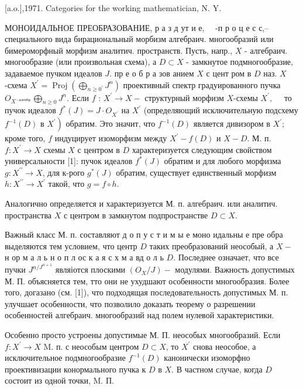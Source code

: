 \documentclass[10pt]{article}
\begin{document}
[a.o.],1971. Categories for the working mathematician, N. Y.



МОНОИДАЛЬНОЕ ПРЕОБРАЗОВАНИЕ, р а з д ут и е, $\quad$-п р о ц е с с,-- специального вида бирациональный морбизм алгебраич. многообразий или бимероморфный морфизм аналитич. пространств. Пусть, напр., $X$ - алгебраич. многообразие (или произвольная схема), а $D \subset X$ - замкнутое подмногообразие, задаваемое пучком идеалов $J$. пр е о б р а зов анием $X$ с цент ром в $D$ наз. $X$-схема $X^{\prime}=\operatorname{Proj}\left(\bigoplus_{n \geqslant 0^{\prime}} J^{n}\right)$ проективный спектр градуированного пучка $O_{X^{-а л г е б р ~}} \bigoplus_{n \geqslant 0} J^{n}$. Если $f$ : $X^{\prime} \rightarrow X-$ структурный морфизм $X$-схемы $X^{\prime}, \quad$ то пучок идеалов $f^{*}(J)=J \cdot O_{X^{\prime}}$ на $X^{\prime}$ (определяющий исключительную подсхему $f^{-1}(D)$ в $\left.X^{\prime}\right)$ обратим. Это значит, что $f^{-1}(D)$ является дивизором в $X^{\prime} ;$ кроме того, $f$ индуцирует изоморфизм между $X^{\prime}-f(D)$ и $X-D$. М. п. $f: X^{\prime} \rightarrow X$ схемы $X$ с центром в $D$ характеризуется следующим свойством универсальности [1]: пучок идеалов $f^{*}(J)$ обратим и для любого морфизма $g: X^{\prime \prime} \rightarrow X$, для к-рого $g^{*}(J)$ обратим, существует единственный морфизм $h: X^{\prime \prime} \rightarrow X^{\prime}$ такой, что $g=f \circ h$.



Аналогично определяется и характеризуется М. п. алгебраич. или аналитич. пространства $X$ с центром в замкнутом подпространстве $D \subset X$.



Важный класс М. п. составляют д о п у с т и м ы е моно идальны е пре обра выделяются тем условием, что центр $D$ таких преобразований неособый, а $X-$ н ор м а л ь н о п л ос к а я с х м а вд о л ь $D$. Последнее означает, что все пучки $J^{n / J^{n+1}}$ являіотся плоскими $\left(O_{X} / J\right)-$ модулями. Важность допустимых М. П. объясняется тем, тто они не ухудшают особенности многообразия. Более того, догазано (см. [1]), что подходящая последовательность допустимых М. п. улучшает особенности, что позволило доказать теорему о разрешении особенностей алгебраич. многообразий над полем нулевой характеристики.



Особенно просто устроены допустимые М. П. неособых многообразий. Если $f: X^{\prime} \rightarrow X$ M. п. с неособым центром $D \subset X$, то $X^{\prime}$ снова неособое, а исключительное подмногообразие $f^{-1}(D)$ канонически изоморфно проективизации конормального пучка к $D$ в $X$. В частном случае, когда $D$ состоит из одной точки, M. П.
\end{document}

